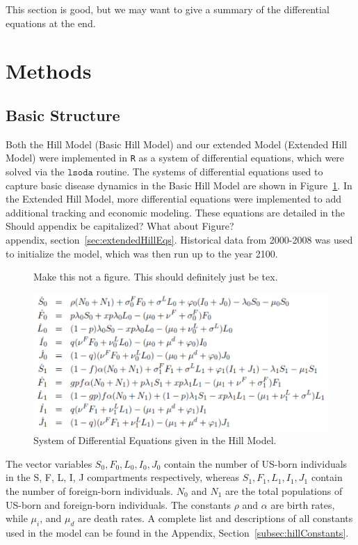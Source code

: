 \documentclass{amsart}
\begin{document}
{\huge\color{red} This section is good, but we may want to give a summary of the
differential equations at the end.}

\section{Methods}
\subsection{Basic Structure}
Both the Hill Model (Basic Hill Model) and our extended Model (Extended Hill
Model) were implemented in \texttt{R} as a system of differential equations,
which were solved via the $\texttt{lsoda}$ routine. The systems of differential
equations used to capture basic disease dynamics in the Basic Hill Model are
shown in Figure~\ref{fig:hillEquations}. In the Extended Hill Model, more
differential equations were implemented to add additional tracking and economic
modeling. These equations are detailed in the\\
{\huge\color{red} Should appendix be capitalized? What about Figure?}\\
appendix,
section~\ref{sec:extendedHillEqs}.  Historical data from 2000-2008 was used to
initialize the model, which was then run up to the year 2100.  

\begin{figure} 
  {\huge\color{red} Make this not a figure. This should definitely just be tex.}
  \begin{center}
    \includegraphics[scale=0.75]{figures/BasicHillEquations.pdf}
  \end{center}
  \caption{System of Differential Equations given in the Hill Model.}
  \label{fig:hillEquations}
\end{figure}

The vector variables $S_0, F_0, L_0, I_0, J_0$ contain the number of US-born
individuals in the S, F, L, I, J compartments respectively, whereas $S_1, F_1,
L_1, I_1, J_1$ contain the number of foreign-born individuals. $N_0$ and $N_1$
are the total populations of US-born and foreign-born individuals.  The
constants $\rho$ and $\alpha$ are birth rates, while $\mu_{i}$, and $\mu_{d}$
are death rates. A complete list and descriptions of all constants used in the
model can be found in the Appendix, Section~\ref{subsec:hillConstants}.
\end{document}

